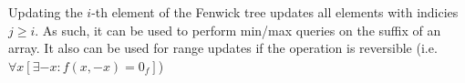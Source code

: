 Updating the $i$-th element of the Fenwick tree updates all elements with indicies $j \geq i$. As such, it can be used to perform min/max queries on the suffix of an array. It also can be used for range updates if the operation is reversible (i.e. $\forall x\left[\exists -x: f(x, -x) = 0_f\right]$)


